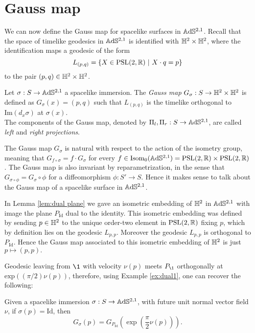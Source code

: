 \section{Gauss map}
We can now define the Gauss map for spacelike surfaces in $\mathbb{A}\mathrm{d}\mathbb{S}^{2,1}$. Recall that the space of timelike geodesics in $\mathbb{A}\mathrm{d}\mathbb{S}^{2,1}$ is identified with $\mathbb{H}^2\times\mathbb{H}^2$, where the identification maps a geodesic of the form
\[
    L_{(p,q)}=\{ X \in\text{PSL}(2,\mathbb{R}) \ | \ X \cdot q = p \}
\]
to the pair $(p,q) \in \mathbb{H}^2\times\mathbb{H}^2$. 
\begin{definition}
    Let $\sigma :S \to\mathbb{A}\mathrm{d}\mathbb{S}^{2,1}$ a spacelike immersion. The \textit{Gauss map} $G_\sigma : S \to \mathbb{H}^2 \times \mathbb{H}^2$ is defined as $G_\sigma(x) = (p,q)$ such that $L_{(p,q)}$ is the timelike orthogonal to $\text{Im}(d_x\sigma)$ at $\sigma(x)$.\\
    The components of the Gauss map, denoted by $\Pi_l, \Pi_r : S \to \mathbb{A}\mathrm{d}\mathbb{S}^{2,1}$, are called \textit{left} and \textit{right projections}. 
\end{definition}
The Gauss map $G_\sigma$ is natural with respect to the action of the isometry group, meaning that $G_{f\circ\sigma} = f \cdot G_\sigma$ for every $f \in\text{Isom}_0(\mathbb{A}\mathrm{d}\mathbb{S}^{2,1}) = \text{PSL}(2,\mathbb{R})\times\text{PSL}(2,\mathbb{R})$. The Gauss map is also invariant by reparametrization, in the sense that $G_{\sigma \circ \phi} = G_\sigma \circ \phi$ for a diffeomorphism $\phi:S'\to S$. Hence it makes sense to talk about the Gauss map of a spacelike surface in $\mathbb{A}\mathrm{d}\mathbb{S}^{2,1}$.

\begin{example}\label{ex:dual1}
    In Lemma \ref{lem:dual plane} we gave an isometric embedding of $\mathbb{H}^2$ in $\mathbb{A}\mathrm{d}\mathbb{S}^{2,1}$ with image the plane $P_{\text{Id}}$ dual to the identity. This isometric embedding was defined by sending $p\in\mathbb{H}^2$ to the unique order-two element in $\text{PSL}(2,\mathbb{R})$ fixing $p$, which by definition lies on the geodesic $L_{p,p}$. Moreover the geodesic $L_{p,p}$ is orthogonal to $P_{\text{Id}}$. Hence the Gauss map associated to this isometric embedding of $\mathbb{H}^2$ is just $p\mapsto (p,p).$
\end{example}
Geodesic leaving from $\1$ with velocity $\nu(p)$ meets $P_\1$ orthogonally at $\text{exp}((\pi/2)\nu(p))$, therefore, using Example \ref{ex:dual1}, one can recover the following:

\begin{lemma}\label{lem:Gaussid}
    Given a spacelike immersion $\sigma:S\to\mathbb{A}\mathrm{d}\mathbb{S}^{2,1}$, with future unit normal vector field $\nu$, if $\sigma(p)=\text{Id}$, then 
    \begin{equation}\label{eq:Gaussid}
        G_\sigma(p)=G_{P_\text{Id}}(\exp(\frac{\pi}{2}\nu(p))).
    \end{equation}
\end{lemma}

